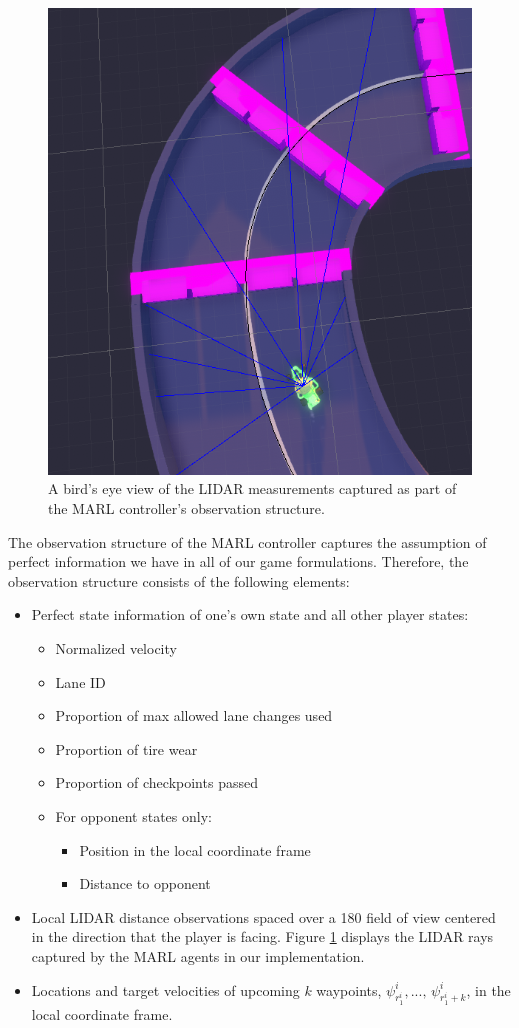 \begin{figure}
  \centering
  \includegraphics[height=0.5\textwidth, angle=270]{Figures/AgentLidar.png}
  \caption[LIDAR observations of MARL-based agents.] {A bird's eye view of the LIDAR measurements captured as part of the MARL controller's observation structure.}
  \label{fig:lidar}
\end{figure}

The observation structure of the MARL controller captures the assumption of perfect information we have in all of our game formulations. Therefore, the observation structure consists of the following elements:
\begin{itemize}
    \item Perfect state information of one's own state and all other player states:
    \begin{itemize}
        \item Normalized velocity
        \item Lane ID
        \item Proportion of max allowed lane changes used
        \item Proportion of tire wear
        \item Proportion of checkpoints passed
        \item For opponent states only: 
        \begin{itemize}
            \item Position in the local coordinate frame
            \item Distance to opponent
        \end{itemize}
        \end{itemize}
    \item Local LIDAR distance observations spaced over a 180\textdegree{} field of view centered in the direction that the player is facing. Figure \ref{fig:lidar} displays the LIDAR rays captured by the MARL agents in our implementation.
    \item Locations and target velocities of upcoming $k$ waypoints, $\psi^i_{r^i_{1}}, ..., \, \psi^i_{r^i_{1} + k}$, in the local coordinate frame. 
\end{itemize}


